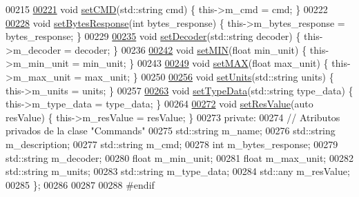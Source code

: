 \begin{DoxyCode}
00215 
\hyperlink{classCommands_a8ef86479788a98de99cc6ad6a78da9a4}{00221}     \textcolor{keywordtype}{void} \hyperlink{classCommands_a8ef86479788a98de99cc6ad6a78da9a4}{setCMD}(std::string cmd) \{ this->m\_cmd = cmd; \}
00222 
\hyperlink{classCommands_a77c946b91fa3f3b7dbdc51ea1cc8208a}{00228}     \textcolor{keywordtype}{void} \hyperlink{classCommands_a77c946b91fa3f3b7dbdc51ea1cc8208a}{setBytesResponse}(\textcolor{keywordtype}{int} bytes\_response) \{ this->m\_bytes\_response = bytes\_response; \}
00229 
\hyperlink{classCommands_acf92f3f0134534808bf6dcfb4496cf97}{00235}     \textcolor{keywordtype}{void} \hyperlink{classCommands_acf92f3f0134534808bf6dcfb4496cf97}{setDecoder}(std::string decoder) \{ this->m\_decoder = decoder; \}
00236 
\hyperlink{classCommands_a073788fa37adc5fc91d3a40b869b8e67}{00242}     \textcolor{keywordtype}{void} \hyperlink{classCommands_a073788fa37adc5fc91d3a40b869b8e67}{setMIN}(\textcolor{keywordtype}{float} min\_unit) \{ this->m\_min\_unit = min\_unit; \}
00243 
\hyperlink{classCommands_a364530a20f17fb20420c5980b1b07ea2}{00249}     \textcolor{keywordtype}{void} \hyperlink{classCommands_a364530a20f17fb20420c5980b1b07ea2}{setMAX}(\textcolor{keywordtype}{float} max\_unit) \{ this->m\_max\_unit = max\_unit; \}
00250 
\hyperlink{classCommands_a35d92f904b7e1d2e806f7f7d92b23952}{00256}     \textcolor{keywordtype}{void} \hyperlink{classCommands_a35d92f904b7e1d2e806f7f7d92b23952}{setUnits}(std::string units) \{ this->m\_units = units; \}
00257 
\hyperlink{classCommands_a1b2c552b493828ef9465d153809be3f2}{00263}     \textcolor{keywordtype}{void} \hyperlink{classCommands_a1b2c552b493828ef9465d153809be3f2}{setTypeData}(std::string type\_data) \{ this->m\_type\_data = type\_data; \}
00264 
\hyperlink{classCommands_a5c8eb30ed986a5071daf5f1135c2eb15}{00272}     \textcolor{keywordtype}{void} \hyperlink{classCommands_a5c8eb30ed986a5071daf5f1135c2eb15}{setResValue}(\textcolor{keyword}{auto} resValue) \{ this->m\_resValue = resValue; \}
00273 \textcolor{keyword}{private}:
00274     \textcolor{comment}{// Atributos privados de la clase "Commands"}
00275     std::string m\_name; 
00276     std::string m\_description; 
00277     std::string m\_cmd; 
00278     \textcolor{keywordtype}{int} m\_bytes\_response; 
00279     std::string m\_decoder; 
00280     \textcolor{keywordtype}{float} m\_min\_unit; 
00281     \textcolor{keywordtype}{float} m\_max\_unit; 
00282     std::string m\_units; 
00283     std::string m\_type\_data; 
00284     std::any m\_resValue; 
00285 \};
00286 
00287 
00288 \textcolor{preprocessor}{#endif}
\end{DoxyCode}

